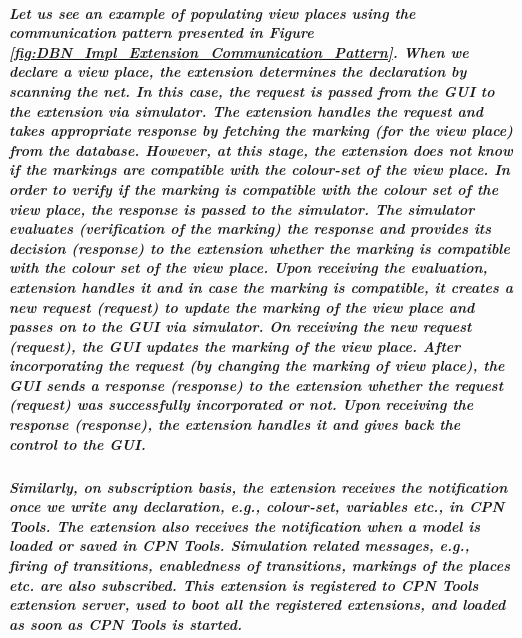 \subparagraph*{\textnormal{Let us see an example of populating view places using the communication pattern presented in Figure \ref{fig:DBN_Impl_Extension_Communication_Pattern}. When we declare a view place, the extension determines the declaration by scanning the net. In this case, the \textit{request} is passed from the GUI to the extension via simulator. The extension \textit{handles} the \textit{request} and takes appropriate \textit{response} by fetching the marking (for the view place) from the database. However, at this stage, the extension does not know if the markings are compatible with the colour-set of the view place. In order to verify if the marking is compatible with the colour set of the view place, the \textit{response} is passed to the simulator. The simulator evaluates (verification of the marking) the \textit{response} and provides its decision (\textit{response\textquotesingle}) to the extension whether the marking is compatible with the colour set of the view place. Upon receiving the evaluation, extension handles it and in case the marking is compatible, it creates a new request (\textit{request\textquotesingle}) to update the marking of the view place and passes on to the GUI via simulator. On receiving the new request (\textit{request\textquotesingle}), the GUI updates the marking of the view place. After incorporating the request (by changing the marking of view place), the GUI sends a response (\textit{response\textquotedbl}) to the extension whether the request (\textit{request\textquotesingle}) was successfully incorporated or not. Upon receiving the response (\textit{response\textquotedbl}), the extension handles it and gives back the control to the GUI.}}

\subparagraph*{\textnormal{Similarly, on subscription basis, the extension receives the notification once we write any declaration, e.g., colour-set, variables etc., in CPN Tools. The extension also receives the notification when a model is loaded or saved in CPN Tools. Simulation related messages, e.g., firing of transitions, enabledness of transitions, markings of the places etc. are also subscribed. This extension is registered to CPN Tools extension server, used to boot all the registered extensions, and loaded as soon as CPN Tools is started.}}

